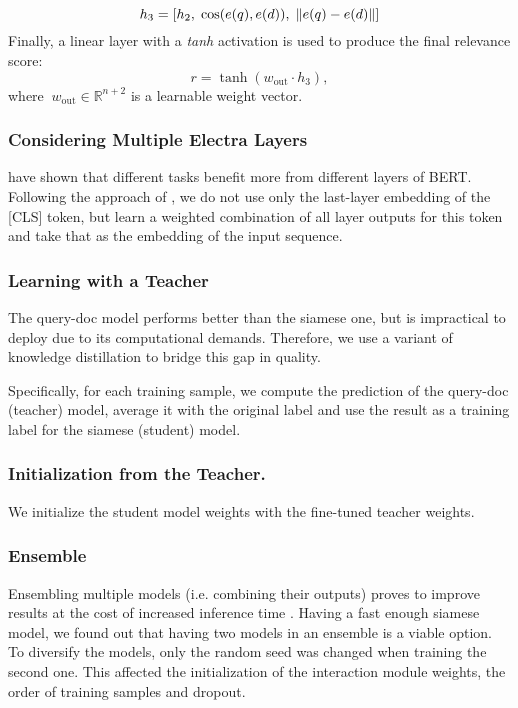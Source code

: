 \documentclass[letterpaper]{article} \usepackage{aaai22 }  \usepackage{times}  \usepackage{helvet}  \usepackage{courier}  \usepackage[hyphens]{url}  \usepackage{graphicx} \usepackage{amsmath,amsfonts,amssymb, mathabx,bm,bbm}
\begin{document}
$$h_3 = [h_2, \hspace{0.1cm} \cos(e(q), e(d)), \hspace{0.1cm} \Vert e(q) - e(d)\Vert]$$
Finally, a linear layer with a \emph{tanh} activation is used to produce the final relevance score: $$r = \tanh(w_\mathrm{out} \cdot h_3),$$
where $\ w_\mathrm{out} \in \mathbb{R}^{n + 2}$ is a learnable weight vector.


\subsubsection{Considering Multiple Electra Layers}

\citet{tenney-etal-2019-bert} have shown that different tasks benefit more from different layers of BERT. Following the approach of \citet{kondratyuk201975}, we do not use only the last-layer embedding of the [CLS] token, but learn a weighted combination of all layer outputs for this token and take that as the embedding of the input sequence.

\subsubsection{Learning with a Teacher}
The query-doc model performs better than the siamese one, but is impractical to deploy due to its computational demands. Therefore, we use a variant of knowledge distillation to bridge this gap in quality.

Specifically, for each training sample, we compute the prediction of the query-doc (teacher) model, average it with the original label and use the result as a training label for the siamese (student) model.

\subsubsection{Initialization from the Teacher.} We initialize the student model weights with the fine-tuned
teacher weights.

\subsubsection{Ensemble}

Ensembling multiple models (i.e. combining their outputs) proves to improve results at the cost of increased inference time \cite{ensemble_ml}. Having a fast enough siamese model, we found out that having two models in an ensemble is a viable option. To diversify the models, only the random seed was changed when training the second one. This affected the initialization of the interaction module weights, the order of training samples and dropout.
\end{document}
